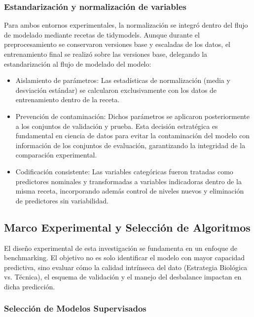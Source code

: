 \subsubsection{Estandarización y normalización de variables}

Para ambos entornos experimentales, la normalización se integró dentro del flujo
de modelado mediante recetas de tidymodels. Aunque durante el preprocesamiento
se conservaron versiones base y escaladas de los datos, el entrenamiento final
se realizó sobre las versiones base, delegando la estandarización al flujo de
modelado
del modelo:

\begin{itemize}
  \item Aislamiento de parámetros: Las estadísticas de normalización (media y
    desviación estándar) se calcularon exclusivamente con los datos de
    entrenamiento dentro de la receta.
  \item Prevención de contaminación: Dichos parámetros se aplicaron posteriormente
    a los conjuntos de validación y prueba. Esta decisión estratégica es
    fundamental en ciencia de datos para evitar la contaminación del modelo con
    información de los conjuntos de evaluación, garantizando la integridad de la
    comparación experimental.
  \item Codificación consistente: Las variables categóricas fueron tratadas como
    predictores nominales y transformadas a variables indicadoras dentro de la
    misma receta, incorporando además control de niveles nuevos y eliminación de
    predictores sin variabilidad.
\end{itemize}

\subsection{Marco Experimental y Selección de Algoritmos}

El diseño experimental de esta investigación se fundamenta en un enfoque de
benchmarking. El objetivo no es solo identificar el modelo con mayor
capacidad predictiva, sino evaluar cómo la calidad intrínseca del dato
(Estrategia Biológica vs. Técnica), el esquema de validación y el manejo del
desbalance impactan en dicha predicción.

\subsubsection{Selección de Modelos Supervisados}

